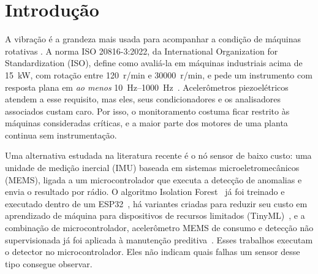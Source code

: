 
\makeatletter
{}
\makeatother

\chapter{Introdução}
\label{cap:introducao}

A vibração é a grandeza mais usada para acompanhar a condição de máquinas rotativas
\cite{randall2011livro}. A norma ISO 20816-3:2022, da International Organization for
Standardization (ISO), define como avaliá-la em máquinas industriais acima de
\SI{15}{\kilo\watt}, com rotação entre \SI{120}{r/min} e \SI{30000}{r/min}, e pede um
instrumento com resposta plana em \emph{ao menos}
\SIrange{10}{1000}{\hertz}~\cite{iso208163_2022}. Acelerômetros piezoelétricos atendem a
esse requisito, mas eles, seus condicionadores e os analisadores associados custam caro.
Por isso, o monitoramento costuma ficar restrito às máquinas consideradas críticas, e a
maior parte dos motores de uma planta continua sem instrumentação.

Uma alternativa estudada na literatura recente é o nó sensor de baixo custo: uma unidade
de medição inercial (IMU) baseada em sistemas microeletromecânicos (MEMS), ligada a um
microcontrolador que executa a detecção de anomalias e envia o resultado por rádio. O
algoritmo Isolation Forest~\cite{liu2008} já foi treinado e executado dentro de um
ESP32~\cite{antonini2023}, há variantes criadas para reduzir seu custo em aprendizado de
máquina para dispositivos de recursos limitados (TinyML)~\cite{barbariol2022}, e a
combinação de microcontrolador, acelerômetro MEMS de consumo e detecção não supervisionada
já foi aplicada à manutenção preditiva~\cite{kolok2025}. Esses trabalhos executam o detector
no microcontrolador. Eles não indicam quais falhas um sensor desse tipo consegue observar.

